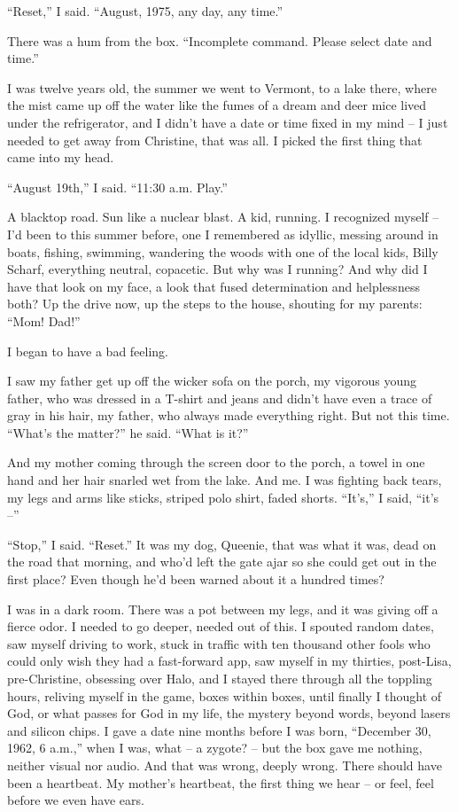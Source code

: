 \documentclass[11pt,a4paper]{article}
\newcommand{\qm}[1]{“#1”}
\begin{document}
\qm{Reset,} I said. \qm{August, 1975, any day, any time.}

There was a hum from the box. \qm{Incomplete command. Please select date and time.}

I was twelve years old, the summer we went to Vermont, to a lake there, where the mist came up off the water like the fumes of a dream and deer mice lived under the refrigerator, and I didn't have a date or time fixed in my mind – I just needed to get away from Christine, that was all. I picked the first thing that came into my head.

\qm{August 19th,} I said. \qm{11:30 a.m. Play.}

A blacktop road. Sun like a nuclear blast. A kid, running. I recognized myself – I'd been to this summer before, one I remembered as idyllic, messing around in boats, fishing, swimming, wandering the woods with one of the local kids, Billy Scharf, everything neutral, copacetic. But why was I running? And why did I have that look on my face, a look that fused determination and helplessness both? Up the drive now, up the steps to the house, shouting for my parents: \qm{Mom! Dad!}

I began to have a bad feeling.

I saw my father get up off the wicker sofa on the porch, my vigorous young father, who was dressed in a T-shirt and jeans and didn't have even a trace of gray in his hair, my father, who always made everything right. But not this time. \qm{What's the matter?} he said. \qm{What is it?}

And my mother coming through the screen door to the porch, a towel in one hand and her hair snarled wet from the lake. And me. I was fighting back tears, my legs and arms like sticks, striped polo shirt, faded shorts. \qm{It's,} I said, \qm{it's –}

\qm{Stop,} I said. \qm{Reset.} It was my dog, Queenie, that was what it was, dead on the road that morning, and who'd left the gate ajar so she could get out in the first place? Even though he'd been warned about it a hundred times?

I was in a dark room. There was a pot between my legs, and it was giving off a fierce odor. I needed to go deeper, needed out of this. I spouted random dates, saw myself driving to work, stuck in traffic with ten thousand other fools who could only wish they had a fast-forward app, saw myself in my thirties, post-Lisa, pre-Christine, obsessing over Halo, and I stayed there through all the toppling hours, reliving myself in the game, boxes within boxes, until finally I thought of God, or what passes for God in my life, the mystery beyond words, beyond lasers and silicon chips. I gave a date nine months before I was born, \qm{December 30, 1962, 6 a.m.,} when I was, what – a zygote? – but the box gave me nothing, neither visual nor audio. And that was wrong, deeply wrong. There should have been a heartbeat. My mother's heartbeat, the first thing we hear – or feel, feel before we even have ears.
\end{document}
